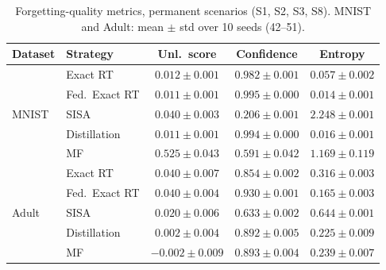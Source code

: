 \begin{table}[H]
\centering
\caption{Forgetting-quality metrics, permanent scenarios (S1, S2, S3, S8). MNIST and Adult: mean $\pm$ std over 10 seeds (42--51).}
\label{tab:forgetting}
\small
\renewcommand{\arraystretch}{1.2}
\begin{tabular}{@{} l l c c c @{}}
\toprule
\textbf{Dataset} & \textbf{Strategy} & \textbf{Unl.\ score} & \textbf{Confidence} & \textbf{Entropy} \\
\midrule
\multirow{5}{*}{MNIST} & Exact RT & $0.012 \pm 0.001$ & $0.982 \pm 0.001$ & $0.057 \pm 0.002$ \\
 & Fed.\ Exact RT & $0.011 \pm 0.001$ & $0.995 \pm 0.000$ & $0.014 \pm 0.001$ \\
 & SISA & $0.040 \pm 0.003$ & $0.206 \pm 0.001$ & $2.248 \pm 0.001$ \\
 & Distillation & $0.011 \pm 0.001$ & $0.994 \pm 0.000$ & $0.016 \pm 0.001$ \\
 & MF & $0.525 \pm 0.043$ & $0.591 \pm 0.042$ & $1.169 \pm 0.119$ \\
\midrule
\multirow{5}{*}{Adult} & Exact RT & $0.040 \pm 0.007$ & $0.854 \pm 0.002$ & $0.316 \pm 0.003$ \\
 & Fed.\ Exact RT & $0.040 \pm 0.004$ & $0.930 \pm 0.001$ & $0.165 \pm 0.003$ \\
 & SISA & $0.020 \pm 0.006$ & $0.633 \pm 0.002$ & $0.644 \pm 0.001$ \\
 & Distillation & $0.002 \pm 0.004$ & $0.892 \pm 0.005$ & $0.225 \pm 0.009$ \\
 & MF & $-0.002 \pm 0.009$ & $0.893 \pm 0.004$ & $0.239 \pm 0.007$ \\
\midrule
\bottomrule
\end{tabular}
\end{table}
